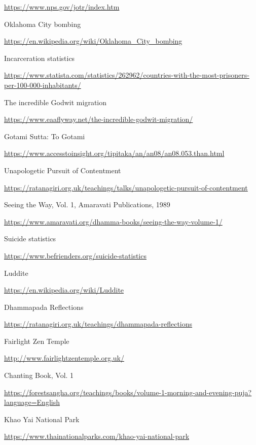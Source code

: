 \begin{thebibliography}{9}
  {\urlsize \url{https://www.nps.gov/jotr/index.htm}}

 Oklahoma City bombing

  {\urlsize \url{https://en.wikipedia.org/wiki/Oklahoma_City_bombing}}

 Incarceration statistics

  {\urlsize \url{https://www.statista.com/statistics/262962/countries-with-the-most-prisoners-per-100-000-inhabitants/}}

 The incredible Godwit migration

  {\urlsize \url{https://www.eaaflyway.net/the-incredible-godwit-migration/}}

 Gotami Sutta: To Gotami

  {\urlsize \url{https://www.accesstoinsight.org/tipitaka/an/an08/an08.053.than.html}}

 Unapologetic Pursuit of Contentment

  {\urlsize \url{https://ratanagiri.org.uk/teachings/talks/unapologetic-pursuit-of-contentment}}

 Seeing the Way, Vol. 1, Amaravati Publications, 1989

  {\urlsize \url{https://www.amaravati.org/dhamma-books/seeing-the-way-volume-1/}}

 Suicide statistics

  {\urlsize \url{https://www.befrienders.org/suicide-statistics}}

 Luddite

  {\urlsize \url{https://en.wikipedia.org/wiki/Luddite}}

 Dhammapada Reflections

  {\urlsize \url{https://ratanagiri.org.uk/teachings/dhammapada-reflections}}

 Fairlight Zen Temple

  {\urlsize \url{http://www.fairlightzentemple.org.uk/}}

 Chanting Book, Vol. 1

  {\urlsize \url{https://forestsangha.org/teachings/books/volume-1-morning-and-evening-puja?language=English}}

 Khao Yai National Park

  {\urlsize \url{https://www.thainationalparks.com/khao-yai-national-park}}


\end{thebibliography}
